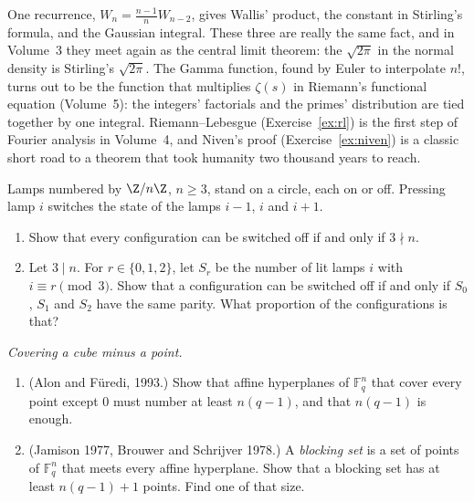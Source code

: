 \begin{beauty}
One recurrence, $W_n=\frac{n-1}nW_{n-2}$, gives Wallis' product, the constant in Stirling's formula, and the Gaussian integral. These three
are really the same fact, and in Volume~3 they meet again as the central limit theorem: the $\sqrt{2\pi}$ in the normal density is Stirling's
$\sqrt{2\pi}$. The Gamma function, found by Euler to interpolate $n!$, turns out to be the function that multiplies $\zeta(s)$ in Riemann's
functional equation (Volume~5): the integers' factorials and the primes' distribution are tied together by one integral. Riemann--Lebesgue
(Exercise~\ref{ex:rl}) is the first step of Fourier analysis in Volume~4, and Niven's proof (Exercise~\ref{ex:niven}) is a classic short road
to a theorem that took humanity two thousand years to reach.
\end{beauty}

\begin{exercise}[$\star\star$]\label{pb:lightsout}
Lamps numbered by $\Z/n\Z$, $n\ge3$, stand on a circle, each on or off. Pressing lamp $i$ switches the state of the lamps
$i-1$, $i$ and $i+1$.
\begin{enumerate}[label=(\alph*)]
\item Show that every configuration can be switched off if and only if $3\nmid n$.
\item Let $3\mid n$. For $r\in\{0,1,2\}$, let $S_r$ be the number of lit lamps $i$ with $i\equiv r\pmod3$. Show that a
configuration can be switched off if and only if $S_0$, $S_1$ and $S_2$ have the same parity. What proportion of the
configurations is that?
\end{enumerate}
\end{exercise}

\begin{exercise}[$\star\star$]\label{pb:hyperplanes}
\emph{Covering a cube minus a point.}
\begin{enumerate}[label=(\alph*)]
\item (Alon and Füredi, 1993.) Show that affine hyperplanes of $\mathbb F_q^n$ that cover every point except $0$ must number at
least $n(q-1)$, and that $n(q-1)$ is enough.
\item (Jamison 1977, Brouwer and Schrijver 1978.) A \emph{blocking set} is a set of points of $\mathbb F_q^n$ that meets every affine
hyperplane. Show that a blocking set has at least $n(q-1)+1$ points. Find one of that size.
\end{enumerate}
\end{exercise}

